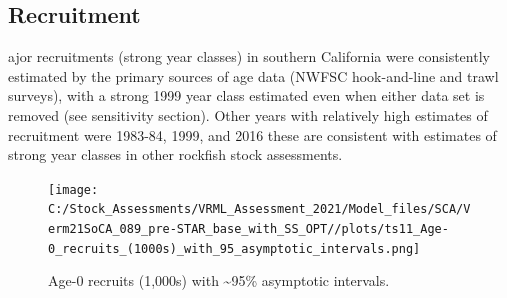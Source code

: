 \documentclass[11pt,
  english,
  a4paper,
]{article}
\begin{document}
\FloatBarrier


\hypertarget{recruitment}{%
\subsection*{Recruitment}\label{recruitment}}

\leavevmode\tagmcend\tagstructend

ajor recruitments (strong year classes) in southern California were consistently estimated by the primary sources of age data (NWFSC hook-and-line and trawl surveys), with a strong 1999 year class estimated even when either data set is removed (see sensitivity section). Other years with relatively high estimates of recruitment were 1983-84, 1999, and 2016 these are consistent with estimates of strong year classes in other rockfish stock assessments.

\begin{figure}
\centering
\texttt{[image: C:/Stock\_Assessments/VRML\_Assessment\_2021/Model\_files/SCA/Verm21SoCA\_089\_pre-STAR\_base\_with\_SS\_OPT//plots/ts11\_Age-0\_recruits\_(1000s)\_with\_95\_asymptotic\_intervals.png]}
\caption{Age-0 recruits (1,000s) with \textasciitilde95\% asymptotic intervals.\label{fig:recruitsES}}
\end{figure}
\end{document}
